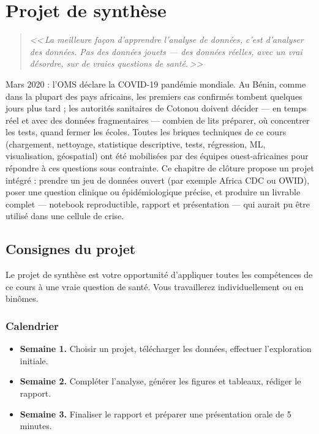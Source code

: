 \chapter{Projet de synth\`ese}
\label{ch:projet-final}

\begin{quote}
\emph{<<\,La meilleure fa\c{c}on d'apprendre l'analyse de donn\'ees, c'est d'analyser des donn\'ees. Pas des donn\'ees jouets --- des donn\'ees r\'eelles, avec un vrai d\'esordre, sur de vraies questions de sant\'e.\,>>}
\end{quote}

Mars 2020 : l'OMS déclare la COVID-19 pandémie mondiale. Au Bénin, comme dans la plupart des pays africains, les premiers cas confirmés tombent quelques jours plus tard ; les autorités sanitaires de Cotonou doivent décider --- en temps réel et avec des données fragmentaires --- combien de lits préparer, où concentrer les tests, quand fermer les écoles. Toutes les briques techniques de ce cours (chargement, nettoyage, statistique descriptive, tests, régression, ML, visualisation, géospatial) ont été mobilisées par des équipes ouest-africaines pour répondre à ces questions sous contrainte. Ce chapitre de clôture propose un projet intégré : prendre un jeu de données ouvert (par exemple Africa CDC ou OWID), poser une question clinique ou épidémiologique précise, et produire un livrable complet --- notebook reproductible, rapport et présentation --- qui aurait pu être utilisé dans une cellule de crise.

\section{Consignes du projet}

Le projet de synth\`ese est votre opportunit\'e d'appliquer toutes les comp\'etences de ce cours \`a une vraie question de sant\'e. Vous travaillerez individuellement ou en bin\^omes.

\subsection{Calendrier}

\begin{itemize}
  \item \textbf{Semaine 1.} Choisir un projet, t\'el\'echarger les donn\'ees, effectuer l'exploration initiale.
  \item \textbf{Semaine 2.} Compl\'eter l'analyse, g\'en\'erer les figures et tableaux, r\'ediger le rapport.
  \item \textbf{Semaine 3.} Finaliser le rapport et pr\'eparer une pr\'esentation orale de 5 minutes.
\end{itemize}

